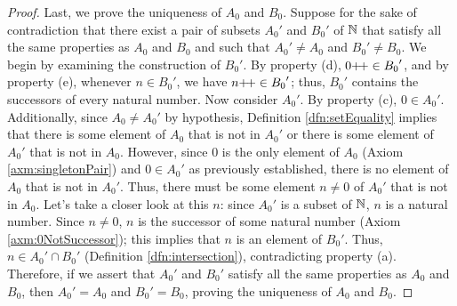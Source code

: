 \documentclass[../main.tex]{subfiles}
\begin{document}
\begin{enumerate}[ref={\thesection.\arabic*}]
\begin{proof}
        Last, we prove the uniqueness of $A_0$ and $B_0$. Suppose for the sake of contradiction that there exist a pair of subsets ${A_0}'$ and ${B_0}'$ of $\mathbb{N}$ that satisfy all the same properties as $A_0$ and $B_0$ and such that ${A_0}'\neq A_0$ and ${B_0}'\neq B_0$. We begin by examining the construction of ${B_0}'$. By property (d), $0{+\!+}\in{B_0}'$, and by property (e), whenever $n\in{B_0}'$, we have $n{+\!+}\in{B_0}'$; thus, ${B_0}'$ contains the successors of every natural number. Now consider ${A_0}'$. By property (c), $0\in{A_0}'$. Additionally, since $A_0\neq{A_0}'$ by hypothesis, Definition \ref{dfn:setEquality} implies that there is some element of $A_0$ that is not in ${A_0}'$ or there is some element of ${A_0}'$ that is not in $A_0$. However, since 0 is the only element of $A_0$ (Axiom \ref{axm:singletonPair}) and $0\in{A_0}'$ as previously established, there is no element of $A_0$ that is not in ${A_0}'$. Thus, there must be some element $n\neq 0$ of ${A_0}'$ that is not in $A_0$. Let's take a closer look at this $n$: since ${A_0}'$ is a subset of $\mathbb{N}$, $n$ is a natural number. Since $n\neq 0$, $n$ is the successor of some natural number (Axiom \ref{axm:0NotSuccessor}); this implies that $n$ is an element of ${B_0}'$. Thus, $n\in{A_0}'\cap{B_0}'$ (Definition \ref{dfn:intersection}), contradicting property (a). Therefore, if we assert that ${A_0}'$ and ${B_0}'$ satisfy all the same properties as $A_0$ and $B_0$, then ${A_0}'=A_0$ and ${B_0}'=B_0$, proving the uniqueness of $A_0$ and $B_0$.\par

\end{proof}
\end{enumerate}
\end{document}
